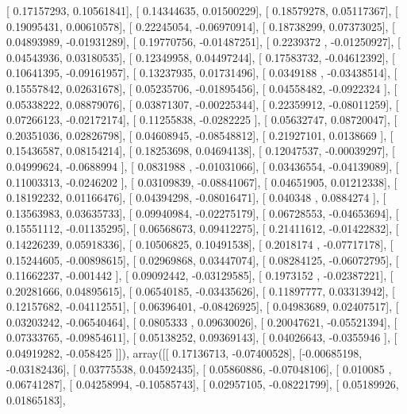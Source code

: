 \documentclass{article}
\begin{document}
       [ 0.17157293,  0.10561841],
       [ 0.14344635,  0.01500229],
       [ 0.18579278,  0.05117367],
       [ 0.19095431,  0.00610578],
       [ 0.22245054, -0.06970914],
       [ 0.18738299,  0.07373025],
       [ 0.04893989, -0.01931289],
       [ 0.19770756, -0.01487251],
       [ 0.2239372 , -0.01250927],
       [ 0.04543936,  0.03180535],
       [ 0.12349958,  0.04497244],
       [ 0.17583732, -0.04612392],
       [ 0.10641395, -0.09161957],
       [ 0.13237935,  0.01731496],
       [ 0.0349188 , -0.03438514],
       [ 0.15557842,  0.02631678],
       [ 0.05235706, -0.01895456],
       [ 0.04558482, -0.0922324 ],
       [ 0.05338222,  0.08879076],
       [ 0.03871307, -0.00225344],
       [ 0.22359912, -0.08011259],
       [ 0.07266123, -0.02172174],
       [ 0.11255838, -0.0282225 ],
       [ 0.05632747,  0.08720047],
       [ 0.20351036,  0.02826798],
       [ 0.04608945, -0.08548812],
       [ 0.21927101,  0.0138669 ],
       [ 0.15436587,  0.08154214],
       [ 0.18253698,  0.04694138],
       [ 0.12047537, -0.00039297],
       [ 0.04999624, -0.0688994 ],
       [ 0.0831988 , -0.01031066],
       [ 0.03436554, -0.04139089],
       [ 0.11003313, -0.0246202 ],
       [ 0.03109839, -0.08841067],
       [ 0.04651905,  0.01212338],
       [ 0.18192232,  0.01166476],
       [ 0.04394298, -0.08016471],
       [ 0.040348  ,  0.0884274 ],
       [ 0.13563983,  0.03635733],
       [ 0.09940984, -0.02275179],
       [ 0.06728553, -0.04653694],
       [ 0.15551112, -0.01135295],
       [ 0.06568673,  0.09412275],
       [ 0.21411612, -0.01422832],
       [ 0.14226239,  0.05918336],
       [ 0.10506825,  0.10491538],
       [ 0.2018174 , -0.07717178],
       [ 0.15244605, -0.00898615],
       [ 0.02969868,  0.03447074],
       [ 0.08284125, -0.06072795],
       [ 0.11662237, -0.001442  ],
       [ 0.09092442, -0.03129585],
       [ 0.1973152 , -0.02387221],
       [ 0.20281666,  0.04895615],
       [ 0.06540185, -0.03435626],
       [ 0.11897777,  0.03313942],
       [ 0.12157682, -0.04112551],
       [ 0.06396401, -0.08426925],
       [ 0.04983689,  0.02407517],
       [ 0.03203242, -0.06540464],
       [ 0.0805333 ,  0.09630026],
       [ 0.20047621, -0.05521394],
       [ 0.07333765, -0.09854611],
       [ 0.05138252,  0.09369143],
       [ 0.04026643, -0.0355946 ],
       [ 0.04919282, -0.058425  ]]), array([[ 0.17136713, -0.07400528],
       [-0.00685198, -0.03182436],
       [ 0.03775538,  0.04592435],
       [ 0.05860886, -0.07048106],
       [ 0.010085  ,  0.06741287],
       [ 0.04258994, -0.10585743],
       [ 0.02957105, -0.08221799],
       [ 0.05189926,  0.01865183],
\end{document}
